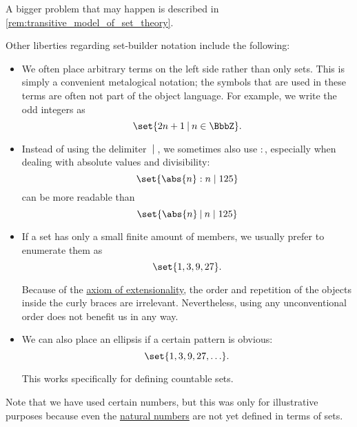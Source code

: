 \begin{definition}
  A bigger problem that may happen is described in \cref{rem:transitive_model_of_set_theory}.

  Other liberties regarding set-builder notation include the following:
  \begin{itemize}
    \item We often place arbitrary terms on the left side rather than only sets. This is simply a convenient metalogical notation; the symbols that are used in these terms are often not part of the object language. For example, we write the odd integers as
    \begin{equation*}
      \set{ 2n + 1 \given n \in \BbbZ }.
    \end{equation*}

    \item Instead of using the delimiter \( \given \), we sometimes also use \( : \), especially when dealing with absolute values and divisibility:
    \begin{equation*}
      \set{ \abs{n} : n \mid 125 }
    \end{equation*}
    can be more readable than
    \begin{equation*}
      \set{ \abs{n} \given n \mid 125 }
    \end{equation*}

    \item If a set has only a small finite amount of members, we usually prefer to enumerate them as
    \begin{equation*}
      \set{ 1, 3, 9, 27 }.
    \end{equation*}

    Because of the \hyperref[def:naive_set_theory/extensionality]{axiom of extensionality}, the order and repetition of the objects inside the curly braces are irrelevant. Nevertheless, using any unconventional order does not benefit us in any way.

    \item We can also place an ellipsis if a certain pattern is obvious:
    \begin{equation*}
      \set{ 1, 3, 9, 27, \ldots }.
    \end{equation*}

    This works specifically for defining countable sets.
  \end{itemize}

  Note that we have used certain numbers, but this was only for illustrative purposes because even the \hyperref[def:natural_numbers]{natural numbers} are not yet defined in terms of sets.
\end{definition}

